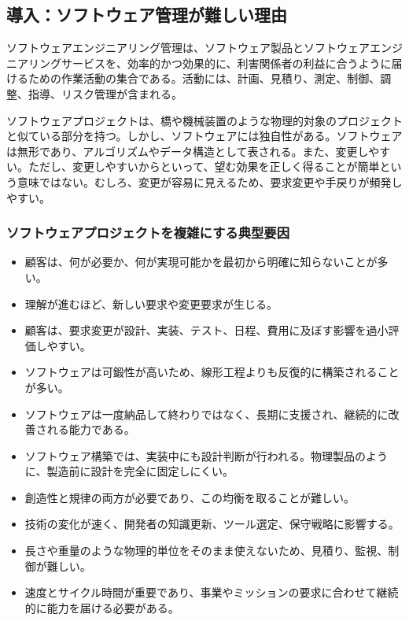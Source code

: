 \documentclass[a4paper,11pt]{ltjsarticle}
\numberwithin{figure}{section}
\numberwithin{table}{section}
\begin{document}
\subsection{導入：ソフトウェア管理が難しい理由}
ソフトウェアエンジニアリング管理は、ソフトウェア製品とソフトウェアエンジニアリングサービスを、効率的かつ効果的に、利害関係者の利益に合うように届けるための作業活動の集合である。活動には、計画、見積り、測定、制御、調整、指導、リスク管理が含まれる。

ソフトウェアプロジェクトは、橋や機械装置のような物理的対象のプロジェクトと似ている部分を持つ。しかし、ソフトウェアには独自性がある。ソフトウェアは無形であり、アルゴリズムやデータ構造として表される。また、変更しやすい。ただし、変更しやすいからといって、望む効果を正しく得ることが簡単という意味ではない。むしろ、変更が容易に見えるため、要求変更や手戻りが頻発しやすい。

\subsubsection{ソフトウェアプロジェクトを複雑にする典型要因}
\begin{itemize}[leftmargin=2em]
  \item 顧客は、何が必要か、何が実現可能かを最初から明確に知らないことが多い。
  \item 理解が進むほど、新しい要求や変更要求が生じる。
  \item 顧客は、要求変更が設計、実装、テスト、日程、費用に及ぼす影響を過小評価しやすい。
  \item ソフトウェアは可鍛性が高いため、線形工程よりも反復的に構築されることが多い。
  \item ソフトウェアは一度納品して終わりではなく、長期に支援され、継続的に改善される能力である。
  \item ソフトウェア構築では、実装中にも設計判断が行われる。物理製品のように、製造前に設計を完全に固定しにくい。
  \item 創造性と規律の両方が必要であり、この均衡を取ることが難しい。
  \item 技術の変化が速く、開発者の知識更新、ツール選定、保守戦略に影響する。
  \item 長さや重量のような物理的単位をそのまま使えないため、見積り、監視、制御が難しい。
  \item 速度とサイクル時間が重要であり、事業やミッションの要求に合わせて継続的に能力を届ける必要がある。
\end{itemize}
\end{document}
